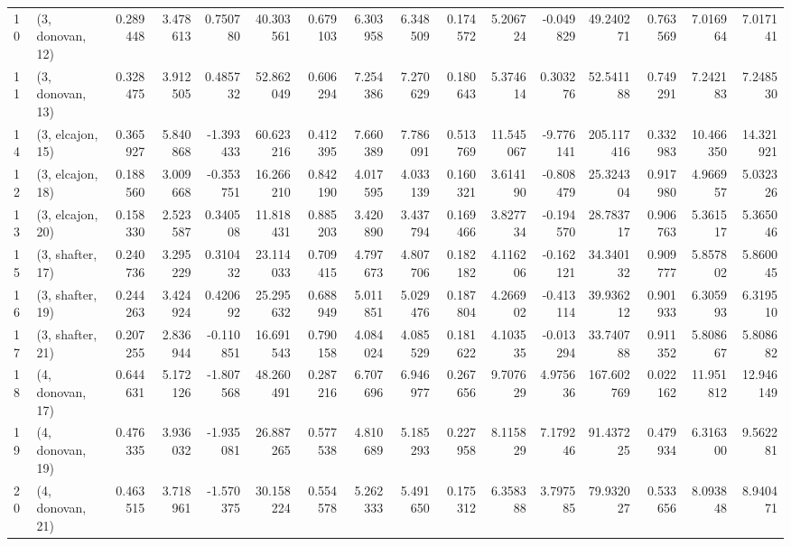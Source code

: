 \begin{tabular}{llrrrrrrrrrrrrrr}
10 &  (3, donovan, 12) &   0.289448 &  3.478613 &  0.750780 &   40.303561 &  0.679103 &   6.303958 &   6.348509 &  0.174572 &   5.206724 & -0.049829 &   49.240271 &  0.763569 &   7.016964 &   7.017141 \\
11 &  (3, donovan, 13) &   0.328475 &  3.912505 &  0.485732 &   52.862049 &  0.606294 &   7.254386 &   7.270629 &  0.180643 &   5.374614 &  0.303276 &   52.541188 &  0.749291 &   7.242183 &   7.248530 \\
14 &  (3, elcajon, 15) &   0.365927 &  5.840868 & -1.393433 &   60.623216 &  0.412395 &   7.660389 &   7.786091 &  0.513769 &  11.545067 & -9.776141 &  205.117416 &  0.332983 &  10.466350 &  14.321921 \\
12 &  (3, elcajon, 18) &   0.188560 &  3.009668 & -0.353751 &   16.266210 &  0.842190 &   4.017595 &   4.033139 &  0.160321 &   3.614190 & -0.808479 &   25.324304 &  0.917980 &   4.966957 &   5.032326 \\
13 &  (3, elcajon, 20) &   0.158330 &  2.523587 &  0.340508 &   11.818431 &  0.885203 &   3.420890 &   3.437794 &  0.169466 &   3.827734 & -0.194570 &   28.783717 &  0.906763 &   5.361517 &   5.365046 \\
15 &  (3, shafter, 17) &   0.240736 &  3.295229 &  0.310432 &   23.114033 &  0.709415 &   4.797673 &   4.807706 &  0.182182 &   4.116206 & -0.162121 &   34.340132 &  0.909777 &   5.857802 &   5.860045 \\
16 &  (3, shafter, 19) &   0.244263 &  3.424924 &  0.420692 &   25.295632 &  0.688949 &   5.011851 &   5.029476 &  0.187804 &   4.266902 & -0.413114 &   39.936212 &  0.901933 &   6.305993 &   6.319510 \\
17 &  (3, shafter, 21) &   0.207255 &  2.836944 & -0.110851 &   16.691543 &  0.790158 &   4.084024 &   4.085529 &  0.181622 &   4.103535 & -0.013294 &   33.740788 &  0.911352 &   5.808667 &   5.808682 \\
18 &  (4, donovan, 17) &   0.644631 &  5.172126 & -1.807568 &   48.260491 &  0.287216 &   6.707696 &   6.946977 &  0.267656 &   9.707629 &  4.975636 &  167.602769 &  0.022162 &  11.951812 &  12.946149 \\
19 &  (4, donovan, 19) &   0.476335 &  3.936032 & -1.935081 &   26.887265 &  0.577538 &   4.810689 &   5.185293 &  0.227958 &   8.115829 &  7.179246 &   91.437225 &  0.479934 &   6.316300 &   9.562281 \\
20 &  (4, donovan, 21) &   0.463515 &  3.718961 & -1.570375 &   30.158224 &  0.554578 &   5.262333 &   5.491650 &  0.175312 &   6.358388 &  3.797585 &   79.932027 &  0.533656 &   8.093848 &   8.940471 \\

\end{tabular}
